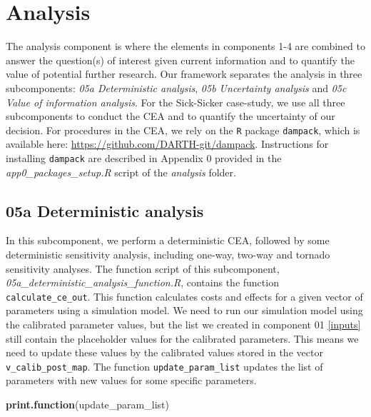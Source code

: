 \documentclass[]{book}
\newenvironment{Shaded}{\begin{snugshade}}{\end{snugshade}}
\newcommand{\KeywordTok}[1]{\textcolor[rgb]{0.13,0.29,0.53}{\textbf{#1}}}
\newcommand{\NormalTok}[1]{#1}
\begin{document}
\hypertarget{analysis}{%
\chapter{Analysis}\label{analysis}}

The analysis component is where the elements in components 1-4 are combined to answer the question(s) of interest given current information and to quantify the value of potential further research. Our framework separates the analysis in three subcomponents: \emph{05a Deterministic analysis}, \emph{05b Uncertainty analysis} and \emph{05c Value of information analysis}. For the Sick-Sicker case-study, we use all three subcomponents to conduct the CEA and to quantify the uncertainty of our decision. For procedures in the CEA, we rely on the \texttt{R} package \texttt{dampack}, which is available here: \url{https://github.com/DARTH-git/dampack}. Instructions for installing \texttt{dampack} are described in Appendix 0 provided in the \emph{app0\_packages\_setup.R} script of the \emph{analysis} folder.

\hypertarget{Deterministic-analysis}{%
\section{05a Deterministic analysis}\label{Deterministic-analysis}}

In this subcomponent, we perform a deterministic CEA, followed by some deterministic sensitivity analysis, including one-way, two-way and tornado sensitivity analyses. The function script of this subcomponent, \emph{05a\_deterministic\_analysis\_function.R}, contains the function \texttt{calculate\_ce\_out}. This function calculates costs and effects for a given vector of parameters using a simulation model. We need to run our simulation model using the calibrated parameter values, but the list we created in component 01 \ref{inputs} still contain the placeholder values for the calibrated parameters. This means we need to update these values by the calibrated values stored in the vector \texttt{v\_calib\_post\_map}. The function \texttt{update\_param\_list} updates the list of parameters with new values for some specific parameters.

\begin{Shaded}
\begin{Highlighting}[]
\KeywordTok{print.function}\NormalTok{(update_param_list)}
\end{Highlighting}
\end{Shaded}
\end{document}

